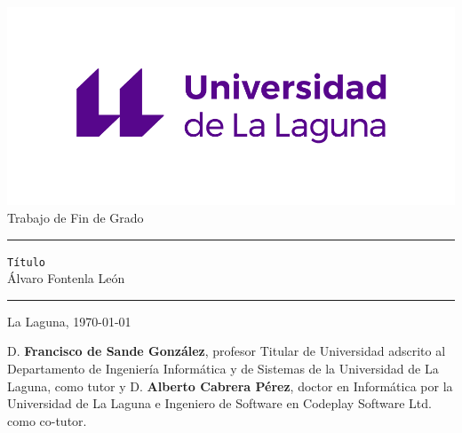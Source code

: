 \documentclass[english,a4paper,12pt,oneside]{extreport}
\newcommand{\TitleTopic}{\texttt{Título}}
\begin{document}
\renewcommand{\lstlistingname}{Listing}%
\pagestyle{empty}
\thispagestyle{empty}

\newcommand{\HRule}{\rule{\linewidth}{1mm}}
\setlength{\parindent}{0mm}
\setlength{\parskip}{0mm}


\begin{center}
\includegraphics[scale=1.1]{images/marca-universidad-de-la-laguna-original}\\[15mm]
{\Huge Trabajo de Fin de Grado}
\end{center}

\HRule
\begin{flushright}
        {\Huge \TitleTopic{}} \\[2.5mm]
        {\Large Álvaro Fontenla León} \\[5mm]


\end{flushright}
\HRule
{}
\begin{center}
  \Large La Laguna, {\today} 
\end{center}
\setlength{\parindent}{5mm}
\newpage
\thispagestyle{empty}

D. {\bf Francisco de Sande González}, profesor Titular de Universidad
adscrito al Departamento de Ingeniería Informática y de Sistemas de la Universidad de La Laguna, como tutor y D. \textbf{Alberto Cabrera Pérez}, doctor en Informática por la Universidad de La Laguna e Ingeniero de Software en Codeplay Software Ltd. como co-tutor.
\end{document}
